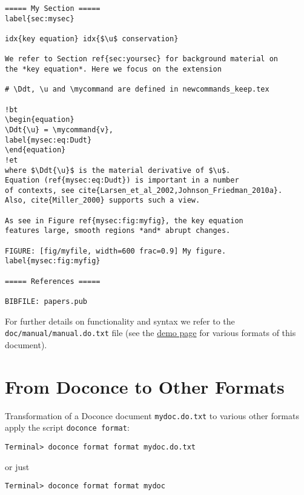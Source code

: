 \documentclass[%
oneside,                 %
final,                   %
10pt]{article}
\begin{document}
\begin{Verbatim}[fontsize=\fontsize{9pt}{9pt},tabsize=8,baselinestretch=0.85,fontfamily=tt,xleftmargin=7mm]
===== My Section =====
label{sec:mysec}

idx{key equation} idx{$\u$ conservation}

We refer to Section ref{sec:yoursec} for background material on
the *key equation*. Here we focus on the extension

# \Ddt, \u and \mycommand are defined in newcommands_keep.tex

!bt
\begin{equation}
\Ddt{\u} = \mycommand{v},
label{mysec:eq:Dudt}
\end{equation}
!et
where $\Ddt{\u}$ is the material derivative of $\u$.
Equation (ref{mysec:eq:Dudt}) is important in a number
of contexts, see cite{Larsen_et_al_2002,Johnson_Friedman_2010a}.
Also, cite{Miller_2000} supports such a view.

As see in Figure ref{mysec:fig:myfig}, the key equation
features large, smooth regions *and* abrupt changes.

FIGURE: [fig/myfile, width=600 frac=0.9] My figure. label{mysec:fig:myfig}

===== References =====

BIBFILE: papers.pub
\end{Verbatim}
\noindent

For further details on functionality and
syntax we refer to the {\fontsize{10pt}{10pt}\Verb!doc/manual/manual.do.txt!} file (see the
\href{{https://doconce.googlecode.com/hg/doc/demos/manual/index.html}}{demo page}
for various formats of this document).




\section{From Doconce to Other Formats}
\label{doconce2formats}

Transformation of a Doconce document {\fontsize{10pt}{10pt}\Verb!mydoc.do.txt!} to various other
formats apply the script {\fontsize{10pt}{10pt}\Verb!doconce format!}:
\vspace{4pt}
\begin{Verbatim}[numbers=none,frame=lines,fontsize=\fontsize{9pt}{9pt},labelposition=topline,framesep=2.5mm,framerule=0.7pt]
Terminal> doconce format format mydoc.do.txt
\end{Verbatim}
or just
\vspace{4pt}
\begin{Verbatim}[numbers=none,frame=lines,fontsize=\fontsize{9pt}{9pt},labelposition=topline,framesep=2.5mm,framerule=0.7pt]
Terminal> doconce format format mydoc
\end{Verbatim}
\end{document}
